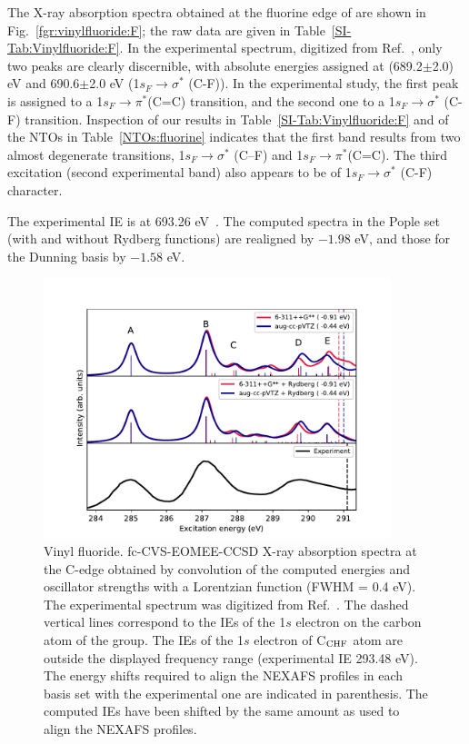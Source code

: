 \documentclass[journal=jctcce,manuscript=article]{achemso}
\begin{document}
The X-ray absorption spectra obtained at the fluorine edge of  are shown in Fig.~\ref{fgr:vinylfluoride:F}; the raw data are given in Table~\ref{SI-Tab:Vinylfluoride:F}.
In the experimental spectrum, digitized from Ref.~, only two peaks are clearly
discernible, with absolute energies assigned at (689.2$\pm$2.0) eV 
and 690.6$\pm$2.0 eV (1$s_F\to \sigma^*$ (C-F)).
In the experimental study, the first peak is assigned to a 
1$s_F \to \pi^*$(C=C) transition, and the second one to
a 1$s_F\to \sigma^*$ (C-F) transition. Inspection of 
our results in Table~\ref{SI-Tab:Vinylfluoride:F} and of the NTOs
in Table~\ref{NTOs:fluorine} indicates that 
the first band results from two almost degenerate transitions, 
1$s_F\to \sigma^*$ (C--F) and 1$s_F \to \pi^*$(C=C). The third excitation (second experimental band)
also appears to be of 1$s_F\to \sigma^*$ (C-F) character.


The experimental IE is at 693.26 eV~\cite{jolly1984core}.
The computed spectra in the Pople set (with and without Rydberg functions) are realigned by $-1.98$ eV, and those for the Dunning basis by $-1.58$ eV. 

\begin{figure}[H]
\includegraphics[width=0.9\textwidth]{Spectra/CH2CHF.pdf}  
\caption{Vinyl fluoride. fc-CVS-EOMEE-CCSD X-ray absorption spectra at the C-edge obtained by convolution of the computed energies and oscillator strengths with a Lorentzian function (FWHM = 0.4 eV). The experimental spectrum was digitized from Ref.~. The dashed vertical lines correspond to the 
IEs of the 1$s$ electron on the carbon atom of the  group. The IEs of the 1$s$ electron of C$_{\ce{CHF}}$ atom are outside the displayed frequency range
(experimental IE 293.48 eV).
The energy shifts 
required to align the NEXAFS profiles in each basis set with the
experimental one are indicated in parenthesis. The computed IEs have been shifted by the same amount as used to align the NEXAFS profiles.
\label{fgr:vinylfluoride:C}}
\end{figure}
\end{document}
